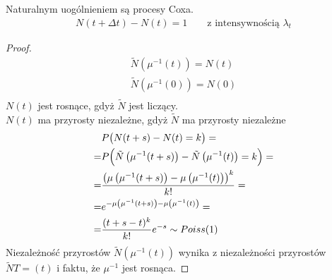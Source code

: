 Naturalnym uogólnieniem są procesy Coxa.
\begin{gather*}
N(t+\Delta t)-N(t)=1\qquad\text{z intensywnością }\lambda_t
\end{gather*}
\begin{proof}
\begin{gather*}
\tilde{N}\left(\mu^{-1}(t)\right)=N(t)\\
\tilde{N}\left(\mu^{-1}(0)\right)=N(0)\\
\end{gather*}
$ N(t) $ jest rosnące, gdyż $ \tilde{N} $ jest liczący.\\
$ N(t) $ ma przyrosty niezależne, gdyż $ \tilde{N} $ ma przyrosty niezależne
\begin{align*}
&P\bigl(N(t+s)-N(t)=k\bigr)
=\\=&
P\Bigl(\tilde{N}\left(\mu^{-1}(t+s)\right)-\tilde{N}\left(\mu^{-1}(t)\right)=k\Bigr)
=\\=&
\frac{\bigl(\mu\left (\mu^{-1}(t+s)\right)-\mu\left (\mu^{-1}(t)\right)\bigr)^k}{k!}
=\\=&
e^{-\mu\left (\mu^{-1}(t+s)\right)-\mu\left (\mu^{-1}(t)\right)}
=\\=&
\frac{(t+s-t)^k}{k!}e^{-s}\sim Poiss(1)
\end{align*}
Niezależność przyrostów $ \tilde{N}(\mu^{-1}(t)) $ wynika z niezależności przyrostów $ \tilde{N}T=(t) $ i faktu, że $ \mu^{-1} $ jest rosnąca.
\end{proof}